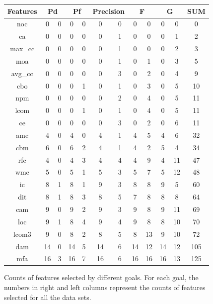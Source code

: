 \documentclass{sig-alternative}
\begin{document}
\begin{figure}[!ht]
\scriptsize
\centering
  \begin{tabular}{c|c c|c c|c c|c c|c c|c }
  \hline\hline
  Features & \multicolumn{2}{c}{Pd} & \multicolumn{2}{c}{Pf} & \multicolumn{2}{c}{Precision} & \multicolumn{2}{c}{F} & \multicolumn{2}{c}{G} & SUM
\\\hline
  noc& 0& 0& 0& 0& 0& 0& 0& 0& 0& 0& 0\\
ca& 0& 0& 0& 0& 0& 1& 0& 0& 0& 1& 2\\
max\_cc& 0& 0& 0& 0& 0& 1& 0& 0& 0& 2& 3\\
moa& 0& 0& 0& 0& 0& 1& 0& 1& 0& 3& 5\\
avg\_cc& 0& 0& 0& 0& 0& 3& 0& 2& 0& 4& 9\\
cbo& 0& 0& 0& 1& 0& 1& 0& 3& 0& 5& 10\\
npm& 0& 0& 0& 0& 0& 2& 0& 4& 0& 5& 11\\
lcom& 0& 0& 0& 1& 0& 1& 0& 4& 0& 5& 11\\
ce& 0& 0& 0& 0& 0& 3& 0& 2& 0& 6& 11\\
amc& 4& 0& 4& 0& 4& 1& 4& 5& 4& 6& 32\\
cbm& 6& 0& 6& 2& 4& 1& 4& 2& 5& 4& 34\\
rfc& 4& 0& 4& 3& 4& 4& 4& 9& 4& 11& 47\\
wmc& 5& 0& 5& 1& 5& 3& 5& 7& 5& 12& 48\\
ic& 8& 1& 8& 1& 9& 3& 8& 8& 9& 5& 60\\
dit& 8& 1& 8& 3& 8& 5& 7& 8& 8& 8& 64\\
cam& 9& 0& 9& 2& 9& 3& 9& 8& 9& 11& 69\\
loc& 9& 1& 8& 4& 9& 4& 9& 8& 8& 10& 70\\
lcom3& 9& 0& 8& 2& 8& 5& 8& 13& 9& 10& 72\\
dam& 14& 0& 14& 5& 14& 6& 14& 12& 14& 12& 105\\
mfa& 16& 3& 16& 7& 16& 6& 16& 16& 16& 13& 125\\
  \end{tabular}
  \caption{Counts of features selected by different goals. For each goal, the numbers in right and left columns represent the counts of features selected for all the data sets.}
\end{figure}
\end{document}

